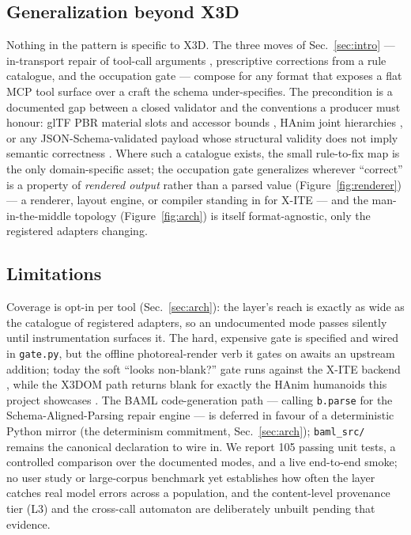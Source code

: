 \documentclass[sigconf,nonacm,screen,anonymous]{acmart}
\begin{document}
\subsection{Generalization beyond X3D}
Nothing in the pattern is specific to X3D. The three moves of Sec.~\ref{sec:intro} --- in-transport repair of tool-call arguments \cite{postel,baml}, prescriptive corrections from a rule catalogue, and the occupation gate --- compose for any format that exposes a flat MCP tool surface \cite{mcp} over a craft the schema under-specifies. The precondition is a documented gap between a closed validator and the conventions a producer must honour: glTF PBR material slots and accessor bounds \cite{gltf}, HAnim joint hierarchies \cite{hanim}, or any JSON-Schema-validated payload whose structural validity does not imply semantic correctness \cite{jsonschema}. Where such a catalogue exists, the small rule-to-fix map is the only domain-specific asset; the occupation gate generalizes wherever ``correct'' is a property of \emph{rendered output} rather than a parsed value (Figure~\ref{fig:renderer}) --- a renderer, layout engine, or compiler standing in for X\nobreakdash-ITE --- and the man-in-the-middle topology (Figure~\ref{fig:arch}) is itself format-agnostic, only the registered adapters changing.

\subsection{Limitations}
Coverage is opt-in per tool (Sec.~\ref{sec:arch}): the layer's reach is exactly as wide as the catalogue of registered adapters, so an undocumented mode passes silently until instrumentation surfaces it. The hard, expensive gate is specified and wired in \texttt{gate.py}, but the offline photoreal-render verb it gates on awaits an upstream addition; today the soft ``looks non-blank?'' gate runs against the X\nobreakdash-ITE backend \cite{xite}, while the X3DOM path returns blank for exactly the HAnim humanoids this project showcases \cite{x3dom}. The BAML code-generation path --- calling \texttt{b.parse} for the Schema-Aligned-Parsing repair engine --- is deferred in favour of a deterministic Python mirror (the determinism commitment, Sec.~\ref{sec:arch}); \texttt{baml\_src/} remains the canonical declaration to wire in. We report 105 passing unit tests, a controlled comparison over the documented modes, and a live end-to-end smoke; no user study or large-corpus benchmark yet establishes how often the layer catches real model errors across a population, and the content-level provenance tier (L3) and the cross-call automaton are deliberately unbuilt pending that evidence.
\end{document}
